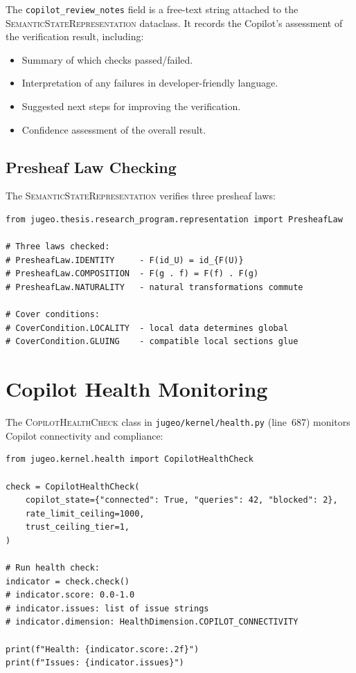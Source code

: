 \documentclass[11pt]{article}
\newcommand{\CopRevNotes}{\texttt{copilot\_review\_notes}}
\newcommand{\SemState}{\textsc{SemanticStateRepresentation}}
\newcommand{\HealthChk}{\textsc{CopilotHealthCheck}}
\begin{document}
\begin{definition}\label{def:review-notes}
The \CopRevNotes{} field is a free-text string attached to the
\SemState{} dataclass.  It records the Copilot's assessment of the
verification result, including:
\begin{itemize}[leftmargin=2em]
  \item Summary of which checks passed/failed.
  \item Interpretation of any failures in developer-friendly language.
  \item Suggested next steps for improving the verification.
  \item Confidence assessment of the overall result.
\end{itemize}
\end{definition}

\subsection{Presheaf Law Checking}

The \SemState{} verifies three presheaf laws:

\begin{lstlisting}[style=jugeo-python]
from jugeo.thesis.research_program.representation import PresheafLaw

# Three laws checked:
# PresheafLaw.IDENTITY     - F(id_U) = id_{F(U)}
# PresheafLaw.COMPOSITION  - F(g . f) = F(f) . F(g)
# PresheafLaw.NATURALITY   - natural transformations commute

# Cover conditions:
# CoverCondition.LOCALITY  - local data determines global
# CoverCondition.GLUING    - compatible local sections glue
\end{lstlisting}

\section{Copilot Health Monitoring}\label{sec:health}

The \HealthChk{} class in \texttt{jugeo/kernel/health.py} (line~687)
monitors Copilot connectivity and compliance:

\begin{lstlisting}[style=jugeo-python]
from jugeo.kernel.health import CopilotHealthCheck

check = CopilotHealthCheck(
    copilot_state={"connected": True, "queries": 42, "blocked": 2},
    rate_limit_ceiling=1000,
    trust_ceiling_tier=1,
)

# Run health check:
indicator = check.check()
# indicator.score: 0.0-1.0
# indicator.issues: list of issue strings
# indicator.dimension: HealthDimension.COPILOT_CONNECTIVITY

print(f"Health: {indicator.score:.2f}")
print(f"Issues: {indicator.issues}")
\end{lstlisting}
\end{document}

